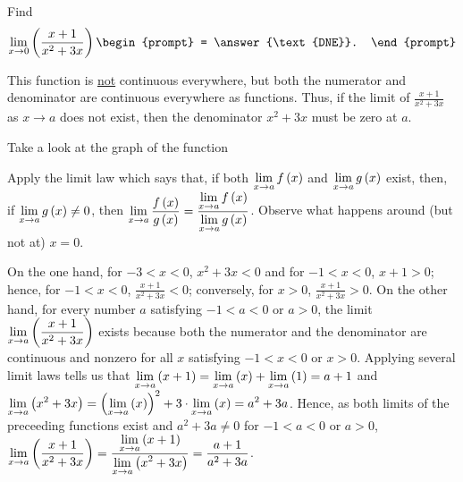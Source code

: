 \documentclass{ximera}
\author{Gregory Hartman \and Matthew Carr}
\begin{document}
\begin{exercise}



  Find 
  \[
  \lim_{x\to0} \p{\frac{x+1}{x^2+3x}}
  \begin{prompt}
  = \answer{\text{DNE}}.
  \end{prompt}
  \]
    \begin{hint}
      This function is \underline{not} continuous everywhere, but both the numerator and denominator are continuous everywhere as functions. Thus, if the limit of $\frac{x+1}{x^2+3x}$ as $x\to a$ does not exist, then the denominator $x^2+3x$ must be zero at $a$.
    \end{hint}
     \begin{hint}
    Take a look at the graph of the function
    \begin{center}
      \end{center}
     Apply the limit law which says that, if both $\lim_{x\to a}f\p{x}$ and $\lim_{x\to a}g\p{x}$ exist, then, if $\lim_{x\to a}g\p{x}\ne0$, then $\lim_{x\to{a}}\frac{f\p{x}}{g\p{x}}=\frac{\lim_{x\to a}f\p{x}}{\lim_{x\to{a}}g\p{x}}$. Observe what happens around (but not at) $x=0$.
    \end{hint}
    \begin{hint}
     On the one hand, for $-3<x<0$, $x^2+3x<0$ and for $-1<x<0$, $x+1>0$; hence, for $-1<x<0$, $\frac{x+1}{x^2+3x}<0$; conversely, for $x>0$, $\frac{x+1}{x^2+3x}>0$. On the other hand, for every number $a$ satisfying $-1<a<0$ or $a>0$, the limit  $\lim_{x\to a}\p{\frac{x+1}{x^2+3x}}$ exists because both the numerator and the denominator are continuous and nonzero for all $x$ satisfying $-1<x<0$ or $x>0$. Applying several limit laws tells us that $\lim_{x\to a}\p{x+1}=\lim_{x\to a}\p{x}+\lim_{x\to a}\p{1}=a+1$ and $\lim_{x\to a}\p{x^2+3x}=\left(\lim_{x\to a}\p{x}\right)^2+3\cdot\lim_{x\to a}\p{x}=a^2+3a$. Hence, as both limits of the preceeding functions exist and $a^2+3a\ne0$ for $-1<a<0$ or $a>0$, $\lim_{x\to a}\p{\frac{x+1}{x^2+3x}}=\frac{\lim_{x\to a}\p{x+1}}{\lim_{x\to a}\p{x^2+3x}}=\frac{a+1}{a^2+3a}$.
     

\end{hint}
\end{exercise}
\end{document}
